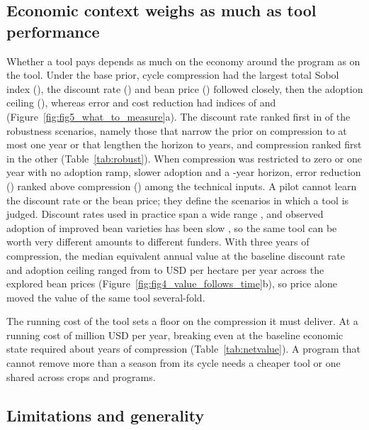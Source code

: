\subsection{Economic context weighs as much as tool performance}\label{sec:disc_context}

Whether a tool pays depends as much on the economy around the program as on the tool. Under the base prior, cycle compression had the largest total Sobol index (\NumSobolSTCyc), the discount rate (\NumSobolSTDisc) and bean price (\NumSobolSTPrice) followed closely, then the adoption ceiling (\NumSobolSTAdopt), whereas error and cost reduction had indices of \NumSobolSTErrRed and \NumSobolSTCostRed (Figure~\ref{fig:fig5_what_to_measure}a). The discount rate ranked first in \NumRvNdiscFirst of the \NumRvNscenarios robustness scenarios, namely those that narrow the prior on compression to at most one year or that lengthen the horizon to \NumCfgHorizonLong years, and compression ranked first in the other \NumRvNcycFirst (Table~\ref{tab:robust}). When compression was restricted to zero or one year with no adoption ramp, slower adoption and a \NumCfgHorizonLong-year horizon, error reduction (\NumRvSTErrConservativeZeroOne) ranked above compression (\NumRvSTCycConservativeZeroOne) among the technical inputs. A pilot cannot learn the discount rate or the bean price; they define the scenarios in which a tool is judged. Discount rates used in practice span a wide range \citep{Harberger2015Musings,Groom2022Future}, and observed adoption of improved bean varieties has been slow \citep{Alene2019Measuring}, so the same tool can be worth very different amounts to different funders. With three years of compression, the median equivalent annual value at the baseline discount rate and adoption ceiling ranged from \NumEAAcycThreePriceLow to \NumEAAcycThreePriceHigh USD per hectare per year across the explored bean prices (Figure~\ref{fig:fig4_value_follows_time}b), so price alone moved the value of the same tool several-fold.

The running cost of the tool sets a floor on the compression it must deliver. At a running cost of \NumCfgRunCostMid million USD per year, breaking even at the baseline economic state required about \NumBECompCostMid years of compression (Table~\ref{tab:netvalue}). A program that cannot remove more than a season from its cycle needs a cheaper tool or one shared across crops and programs.

\subsection{Limitations and generality}\label{sec:disc_limits}

